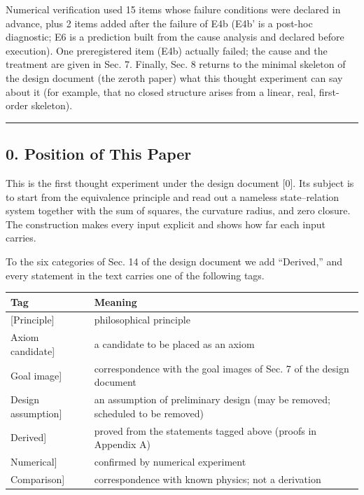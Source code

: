 \documentclass[
  a4paper,
]{article}
\newcounter{none} %
\begin{document}
Numerical verification used 15 items whose failure conditions were
declared in advance, plus 2 items added after the failure of E4b (E4b'
is a post-hoc diagnostic; E6 is a prediction built from the cause
analysis and declared before execution). One preregistered item (E4b)
actually failed; the cause and the treatment are given in Sec. 7.
Finally, Sec. 8 returns to the minimal skeleton of the design document
(the zeroth paper) what this thought experiment can say about it (for
example, that no closed structure arises from a linear, real,
first-order skeleton).

\begin{center}\rule{0.5\linewidth}{0.5pt}\end{center}

\subsection{0. Position of This Paper}\label{position-of-this-paper}

This is the first thought experiment under the design document {[}0{]}.
Its subject is to start from the equivalence principle and read out a
nameless state--relation system together with the sum of squares, the
curvature radius, and zero closure. The construction makes every input
explicit and shows how far each input carries.

To the six categories of Sec. 14 of the design document we add
``Derived,'' and every statement in the text carries one of the
following tags.

{\def\LTcaptype{none} %
\begin{longtable}[]{@{}
  >{\raggedright\arraybackslash}p{}
  >{\raggedright\arraybackslash}p{}@{}}
\toprule\noalign{}
\begin{minipage}[b]{\linewidth}\raggedright
Tag
\end{minipage} & \begin{minipage}[b]{\linewidth}\raggedright
Meaning
\end{minipage} \\
\midrule\noalign{}
\endhead
\bottomrule\noalign{}
\endlastfoot
{[}Principle{]} & philosophical principle \\
{[}Axiom candidate{]} & a candidate to be placed as an axiom \\
{[}Goal image{]} & correspondence with the goal images of Sec. 7 of the
design document \\
{[}Design assumption{]} & an assumption of preliminary design (may be
removed; scheduled to be removed) \\
{[}Derived{]} & proved from the statements tagged above (proofs in
Appendix A) \\
{[}Numerical{]} & confirmed by numerical experiment \\
{[}Comparison{]} & correspondence with known physics; not a
derivation \\
\end{longtable}
}
\end{document}
